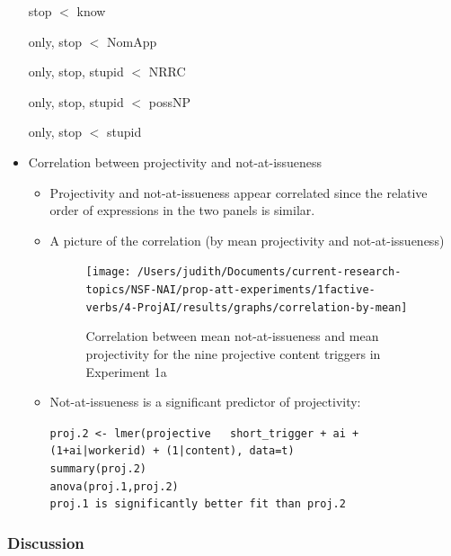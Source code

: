 \documentclass[11pt,fleqn]{article}
\newcommand{\6}{\mbox{$[\hspace*{-.6mm}[$}}
\newcommand{\9}{\mbox{$]\hspace*{-.6mm}]$}}
\begin{document}
\begin{itemize}
stop $<$ know

only, stop $<$ NomApp

only, stop, stupid $<$ NRRC

only, stop, stupid $<$ possNP

only, stop $<$ stupid

\item Correlation between projectivity and not-at-issueness


\begin{itemize}

\item Projectivity and not-at-issueness appear correlated since the relative order of expressions in the two panels is similar. 

\item A picture of the correlation (by mean projectivity and not-at-issueness)

\begin{figure}[!h]

\begin{center}
\texttt{[image: /Users/judith/Documents/current-research-topics/NSF-NAI/prop-att-experiments/1factive-verbs/4-ProjAI/results/graphs/correlation-by-mean]}

\end{center}

\caption{Correlation between mean not-at-issueness and mean projectivity for the nine projective content triggers in Experiment 1a}\label{f-corr1a}
\end{figure}

\item Not-at-issueness is a significant predictor of projectivity:

{\tt proj.2 <- lmer(projective ~ short\_trigger + ai + (1+ai|workerid) + (1|content), data=t)
\\ summary(proj.2)
\\ anova(proj.1,proj.2)
\\ proj.1 is significantly better fit than proj.2}


\end{itemize}

\end{itemize}


\subsubsection{Discussion}
\end{document}
